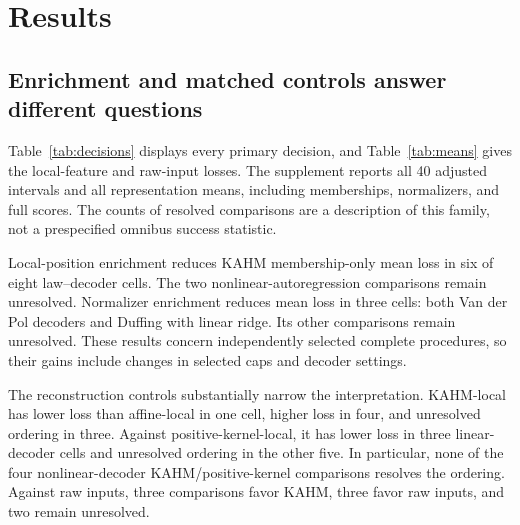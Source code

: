 \section{Results}\label{sec:results}
\subsection{Enrichment and matched controls answer different questions}
Table~\ref{tab:decisions} displays every primary decision, and Table~\ref{tab:means} gives the local-feature and raw-input losses. The supplement reports all 40 adjusted intervals and all representation means, including memberships, normalizers, and full scores. The counts of resolved comparisons are a description of this family, not a prespecified omnibus success statistic.

Local-position enrichment reduces KAHM membership-only mean loss in six of eight law--decoder cells. The two nonlinear-autoregression comparisons remain unresolved. Normalizer enrichment reduces mean loss in three cells: both Van der Pol decoders and Duffing with linear ridge. Its other comparisons remain unresolved. These results concern independently selected complete procedures, so their gains include changes in selected caps and decoder settings.

The reconstruction controls substantially narrow the interpretation. KAHM-local has lower loss than affine-local in one cell, higher loss in four, and unresolved ordering in three. Against positive-kernel-local, it has lower loss in three linear-decoder cells and unresolved ordering in the other five. In particular, none of the four nonlinear-decoder KAHM/positive-kernel comparisons resolves the ordering. Against raw inputs, three comparisons favor KAHM, three favor raw inputs, and two remain unresolved.

\begin{table}[t]
\centering\small\setlength{\tabcolsep}{3.6pt}
\caption{Complete primary decision family. ``Lower'' and ``Higher'' indicate that the adjusted interval for candidate minus reference mean SMSE is wholly negative or positive. ``Unresolved'' is not equivalence. The candidate is KAHM-local except in Norm/Mem, where it is KAHM-normalizer. Mem, Aff, Pos, and Raw denote KAHM-memberships, affine-local, positive-kernel-local, and raw input. All entries use independent validation selection and 64 repetitions within the named law.}\label{tab:decisions}

\end{table}
\begin{table}[t]
\centering\small\setlength{\tabcolsep}{4.4pt}
\caption{Terminal mean SMSE for local encodings and raw inputs under independent selection. Lower is better. The nonlinear decoder has 64 Gaussian Nystr\"om landmarks and retains its linear input. Mean ordering alone does not give the adjusted decisions in Table~\ref{tab:decisions}.}\label{tab:means}

\end{table}

